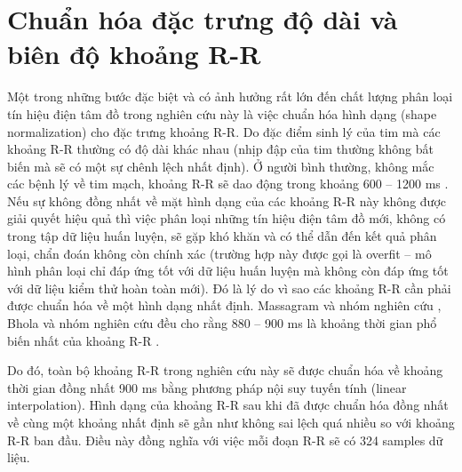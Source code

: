 \section{Chuẩn hóa đặc trưng độ dài và biên độ khoảng R-R }
Một trong những bước đặc biệt và có ảnh hưởng rất lớn đến chất lượng phân loại tín hiệu điện tâm đồ trong nghiên cứu này là việc chuẩn hóa hình dạng (shape normalization) cho đặc trưng khoảng R-R. Do đặc điểm sinh lý của tim mà các khoảng R-R thường có độ dài khác nhau (nhịp đập của tim thường không bất biến mà sẽ có một sự chênh lệch nhất định). Ở người bình thường, không mắc các bệnh lý về tim mạch, khoảng R-R sẽ dao động trong khoảng 600 – 1200 ms \cite{64} . Nếu sự không đồng nhất về mặt hình dạng của các khoảng R-R này không được giải quyết hiệu quả thì việc phân loại những tín hiệu điện tâm đồ mới, không có trong tập dữ liệu huấn luyện, sẽ gặp khó khăn và có thể dẫn đến kết quả phân loại, chẩn đoán không còn chính xác (trường hợp này được gọi là overfit – mô hình phân loại chỉ đáp ứng tốt với dữ liệu huấn luyện mà không còn đáp ứng tốt với dữ liệu kiểm thử hoàn toàn mới). Đó là lý do vì sao các khoảng R-R cần phải được chuẩn hóa về một hình dạng nhất định. Massagram và nhóm nghiên cứu \cite{67}, Bhola và nhóm nghiên cứu đều cho rằng 880 – 900 ms là khoảng thời gian phổ biến nhất của khoảng R-R \cite{68}.\par
Do đó, toàn bộ khoảng R-R trong nghiên cứu này sẽ được chuẩn hóa về khoảng thời gian đồng nhất 900 ms bằng phương pháp nội suy tuyến tính (linear interpolation). Hình dạng của khoảng R-R sau khi đã được chuẩn hóa đồng nhất về cùng một khoảng nhất định sẽ gần như không sai lệch quá nhiều so với khoảng R-R ban đầu. Điều này đồng nghĩa với việc mỗi đoạn R-R sẽ có 324 samples dữ liệu.\par


